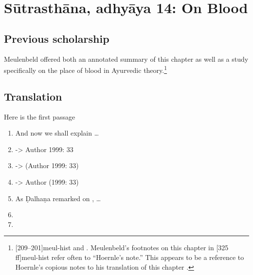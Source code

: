 
\section{Sūtrasthāna, adhyāya 14:  On Blood}


\subsection{Previous scholarship}

Meulenbeld offered both an annotated summary of this chapter as well as a
 study specifically on the place of blood
in Ayurvedic theory.\footnote{[209--201]{meul-hist}  and  
\cite{meul-1991}.  Meulenbeld's footnotes on this chapter in 
[325\,ff]{meul-hist} refer often to ``Hoernle's note.''  This appears to be 
a reference to Hoernle's copious notes to his translation of this chapter 
\citep[87--98]{hoer-1897}.}







\subsection{Translation}

\begin{translation}    
\item [1] Here is the first passage

   \begin{enumerate}
  
       \item 
    And now we shall explain \ldots {}

\item 

    \cite[33]{adri-1984} -> Author 1999: 33
\item     
    \citep[33]{adri-1984} -> (Author 1999: 33)
\item     
    \citet[33]{adri-1984} -> Author (1999: 33) 
\item 
    As Ḍalhaṇa remarked on , \ldots  %
\item \SS
\item \CS
   \end{enumerate}
    

\end{translation}

